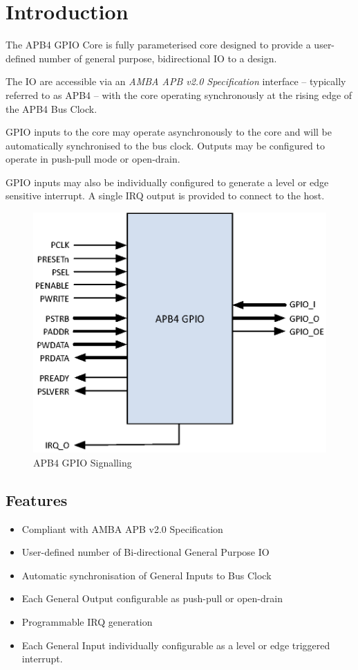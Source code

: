 \chapter{Introduction} \label{introduction}

The APB4 GPIO Core is fully parameterised core designed to provide a user-defined number of general purpose, bidirectional IO to a design.

The IO are accessible via an \emph{AMBA APB v2.0 Specification} interface -- typically referred to as APB4 -- with the core operating synchronously at the rising edge of the APB4 Bus Clock.

GPIO inputs to the core may operate asynchronously to the core and will be automatically synchronised to the bus clock. Outputs may be configured to operate in push-pull mode or open-drain.

GPIO inputs may also be individually configured to generate a level or edge sensitive interrupt. A single IRQ output is provided to connect to the host.

\begin{figure}[tbh]
	\centering
	\includegraphics{assets/img/apb4-gpio-sig}
	\caption{APB4 GPIO Signalling}
	\label{fig:apb4-gpio-sig}
\end{figure}

\section{Features}\label{features}

\begin{itemize}
\item
  Compliant with AMBA APB v2.0 Specification
\item
  User-defined number of Bi-directional General Purpose IO
\item
  Automatic synchronisation of General Inputs to Bus Clock
\item
  Each General Output configurable as push-pull or open-drain
\item
  Programmable IRQ generation
\item
  Each General Input individually configurable as a level or edge triggered interrupt.
\end{itemize}

